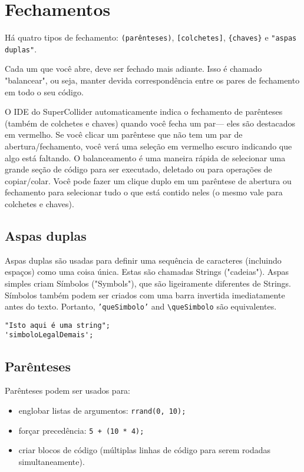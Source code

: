 \section{Fechamentos}

Há quatro tipos de fechamento: \texttt{(parênteses)}, \texttt{[colchetes]}, \texttt{\{chaves\}} e \texttt{"aspas duplas"}.

Cada um que você abre, deve ser fechado mais adiante. Isso é chamado "balancear", ou seja, manter devida correspondência entre os pares de fechamento em todo o seu código.

O IDE do SuperCollider automaticamente indica o fechamento de parênteses (também de colchetes e chaves) quando você fecha um par--- eles são destacados em vermelho. Se você clicar um parêntese que não tem um par de abertura/fechamento, você verá uma seleção em vermelho escuro indicando que algo está faltando. O balanceamento é uma maneira rápida de selecionar uma grande seção de código para ser executado, deletado ou para operações de copiar/colar. Você pode fazer um clique duplo em um parêntese de abertura ou fechamento para selecionar tudo o que está contido neles (o mesmo vale para colchetes e chaves).

\subsection{Aspas duplas}

Aspas duplas são usadas para definir uma sequência de caracteres (incluindo espaços) como uma coisa única. Estas são chamadas Strings ("cadeias"). Aspas simples criam Símbolos ("Symbols"), que são ligeiramente diferentes de Strings. Símbolos também podem ser criados com uma barra invertida imediatamente antes do texto. Portanto, \texttt{'queSimbolo'} and \texttt{\textbackslash queSimbolo} são equivalentes.

\begin{lstlisting}[style=SuperCollider-IDE, basicstyle=\scttfamily\footnotesize]
"Isto aqui é uma string";
'simboloLegalDemais';
\end{lstlisting}

\subsection{Parênteses}

Parênteses podem ser usados para:

\begin{itemize}
\item englobar listas de argumentos: \texttt{rrand(0, 10);}
\item forçar precedência: \texttt{5 + (10 * 4);}
\item criar blocos de código (múltiplas linhas de código para serem rodadas simultaneamente).
\end{itemize} 

